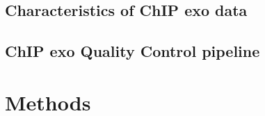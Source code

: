 \documentclass{bmcart}\usepackage[]{graphicx}\usepackage[]{color}
\begin{document}
\subsection{Characteristics of ChIP exo data}
\label{sec:charac}



\subsection{ChIP exo Quality Control pipeline}
\label{sec:QC}






\section*{Methods}
\label{sec:methods}







\nocite{exo_gb}
\end{document}
